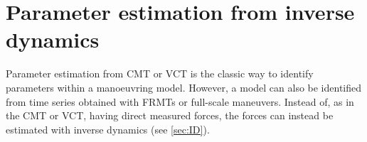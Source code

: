 \section{Parameter estimation from inverse dynamics} \label{sec:IDR}
Parameter estimation from CMT or VCT is the classic way to identify parameters within a manoeuvring model. However, a model can also be identified from time series obtained with FRMTs or full-scale maneuvers. Instead of, as in the CMT or VCT, having direct measured forces, the forces can instead be estimated with inverse dynamics (see \autoref{sec:ID}). 


